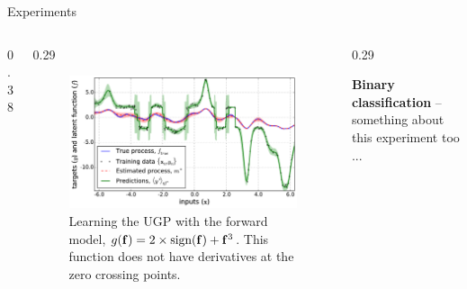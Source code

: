 \documentclass[final]{beamer}
\newlength{\onecolwid}
\newlength{\twocolwid}
\begin{document}
\begin{frame}[t]
\begin{columns}[t]
\begin{column}{\twocolwid}
\begin{columns}[t,totalwidth=\twocolwid]
\begin{column}{\twocolwid}
\begin{block}{Experiments}
\begin{columns}
\begin{column}{0.38\twocolwid}
\end{column}
\begin{column}{0.29\twocolwid}\vspace{-.8in}

\begin{figure}
    \includegraphics[width=0.6\onecolwid]{fig/signdemo.png}
    \caption[]{Learning the UGP with the forward model, $g\!\left({{\mathbf{f}}}\right) = 
            2\times\text{sign}\!\left({\mathbf{f}}\right) + \mathbf{f}^3$. This function does
            not have derivatives at the zero crossing points.}
   \label{fig:sign}
\end{figure}

\end{column}
\begin{column}{0.29\twocolwid}\vspace{-1.8in}

\textbf{Binary classification} -- something about this experiment too ...


\end{column}
\end{columns}
\end{block}
\end{column}
\end{columns}
\end{column}
\end{columns}
\end{frame}
\end{document}
